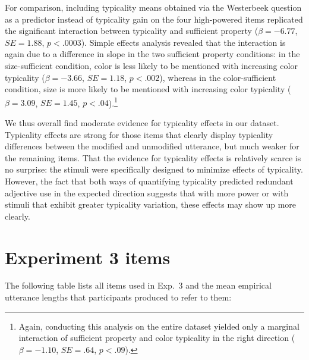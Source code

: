 \documentclass[11pt]{article}
\begin{document}
For comparison, including typicality means obtained via the Westerbeek question as a predictor instead of typicality gain on the four high-powered items replicated the significant interaction between typicality and sufficient property ($\beta = -6.77$, $SE = 1.88$, $p < .0003$). Simple effects analysis revealed that the interaction is again due to a difference in slope in the two sufficient property conditions: in the size-sufficient condition, color is less likely to be mentioned with increasing color typicality   ($\beta = -3.66$, $SE = 1.18$, $p < .002$), whereas in the color-sufficient condition, size is more likely to be mentioned with increasing color typicality ($\beta = 3.09$, $SE = 1.45$, $p < .04$).\footnote{Again, conducting this analysis on the entire dataset yielded only a marginal interaction of sufficient property and color typicality in the right direction ($\beta = -1.10$, $SE = .64$, $p < .09$).}

We thus overall find moderate evidence for typicality effects in our dataset. Typicality effects are strong for those items that clearly display typicality differences between the modified and unmodified utterance, but much weaker for the remaining items. That the evidence for typicality effects is relatively scarce is no surprise: the stimuli were specifically designed to minimize effects of typicality. However, the fact that both ways of quantifying typicality predicted redundant adjective use in the expected direction suggests that with more power or with stimuli that exhibit greater typicality variation, these effects may show up more clearly.

\section{Experiment 3 items}
\label{app:taxonomicstimuli}


The following table lists all items used in Exp.~3 and the mean empirical utterance lengths that participants produced to refer to them:
\end{document}
